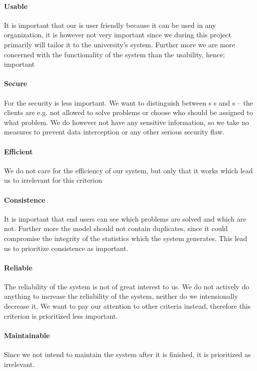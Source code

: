 \paragraph{Usable}
It is important that our \hdesk[] is user friendly because it can be used in any organization, it is however not very important since we during this project primarily will tailor it to the university's system.
Further more we are more concerned with the functionality of the system than the usability, hence; important 
\paragraph{Secure}
For the \hdesk[] security is less important. We want to distinguish between \aclient s \astaff s and \admin s -- the clients are e.g. not allowed to solve problems or choose who should be assigned to what problem.
We do however not have any sensitive information, so we take no measures to prevent data interception or any other serious security flaw.
\paragraph{Efficient}
We do not care for the efficiency of our system, but only that it works which lead us to irrelevant for this criterion 
\paragraph{Consistence}
It is important that end users can see which problems are solved and which are not.
Further more the \hdesk[] model should not contain duplicates, since it could compromise the integrity of the statistics which the system generates.
This lead us to prioritize consistence as important.
\paragraph{Reliable}
The reliability of the \hdesk[] system is not of great interest to us.
We do not actively do anything to increase the reliability of the system, neither do we intensionally decrease it.
We want to pay our attention to other criteria instead, therefore this criterion is prioritized less important.
\paragraph{Maintainable}
Since we not intend to maintain the system after it is finished, it is prioritized as irrelevant.
